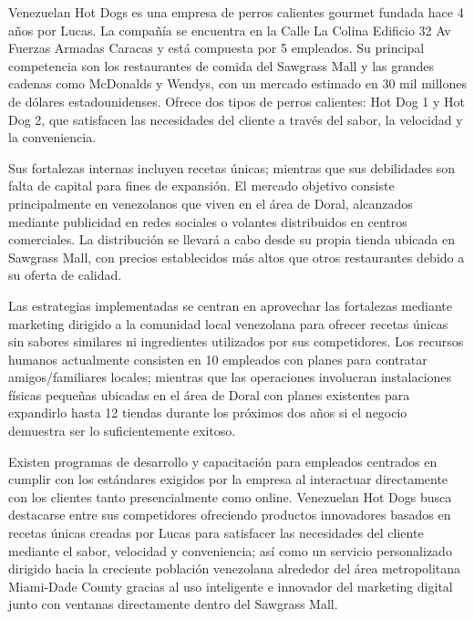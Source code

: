 Venezuelan Hot Dogs es una empresa de perros calientes gourmet fundada hace 4 años por Lucas. La compañía se encuentra en la Calle La Colina Edificio 32 Av Fuerzas Armadas Caracas y está compuesta por 5 empleados. Su principal competencia son los restaurantes de comida del Sawgrass Mall y las grandes cadenas como McDonalds y Wendys, con un mercado estimado en 30 mil millones de dólares estadounidenses. Ofrece dos tipos de perros calientes: Hot Dog 1 y Hot Dog 2, que satisfacen las necesidades del cliente a través del sabor, la velocidad y la conveniencia.

Sus fortalezas internas incluyen recetas únicas; mientras que sus debilidades son falta de capital para fines de expansión. El mercado objetivo consiste principalmente en venezolanos que viven en el área de Doral, alcanzados mediante publicidad en redes sociales o volantes distribuidos en centros comerciales. La distribución se llevará a cabo desde su propia tienda ubicada en Sawgrass Mall, con precios establecidos más altos que otros restaurantes debido a su oferta de calidad.

Las estrategias implementadas se centran en aprovechar las fortalezas mediante marketing dirigido a la comunidad local venezolana para ofrecer recetas únicas sin sabores similares ni ingredientes utilizados por sus competidores. Los recursos humanos actualmente consisten en 10 empleados con planes para contratar amigos/familiares locales; mientras que las operaciones involucran instalaciones físicas pequeñas ubicadas en el área de Doral con planes existentes para expandirlo hasta 12 tiendas durante los próximos dos años si el negocio demuestra ser lo suficientemente exitoso.

Existen programas de desarrollo y capacitación para empleados centrados en cumplir con los estándares exigidos por la empresa al interactuar directamente con los clientes tanto presencialmente como online. Venezuelan Hot Dogs busca destacarse entre sus competidores ofreciendo productos innovadores basados ​​en recetas únicas creadas por Lucas para satisfacer las necesidades del cliente mediante el sabor, velocidad y conveniencia; así como un servicio personalizado dirigido hacia la creciente población venezolana alrededor del área metropolitana Miami-Dade County gracias al uso inteligente e innovador del marketing digital junto con ventanas directamente dentro del Sawgrass Mall.
